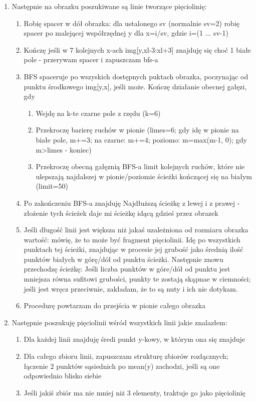 \documentclass[12pt]{article}
\begin{document}
\begin {enumerate}
\begin {enumerate}
		\end {enumerate}
		\item{Następnie na obrazku poszukiwane są linie tworzące pięciolinię:}
		\begin {enumerate}
			\item{Robię spacer w dół obrazka: dla ustalonego sv (normalnie sv=2) robię spacer po malejącej współrzędnej y dla x=i/sv, gdzie i=(1 ... sv-1)}
			\item{Kończę jeśli w 7 kolejnych x-ach img[y,xl-3:xl+3] znajduję się choć 1 białe pole - przerywam spacer i zapuszczam bfs-a}
			\item{BFS spaceruje po wszyskich dostępnych puktach obrazka, poczynając od punktu środkowego img[y,x], jeśli może. Kończę działanie obecnej gałęzi, gdy}
			\begin{enumerate}
				\item{Wejdę na k-te czarne pole z rzędu (k=6)}
				\item{Przekroczę barierę ruchów w pionie (limes=6; gdy idę w pionie na białe pole, m+=3; na czarne: m+=4; poziomo: m=max(m-1, 0); gdy m>limes - koniec)}
				\item{Przekroczę obecną gałęznią BFS-a limit kolejnych ruchów, które nie ulepszają najdalszej w pionie/poziomie ścieżki kończącej się na białym (limit=50)}
			\end{enumerate}
			\item{Po zakończeniu BFS-a znajduję Najdłuższą ścieżkę z lewej i z prawej - złożenie tych ścieżek daje mi ścieżkę idącą gdzieś przez obrazek}
			\item{Jeśli długość linii jest większa niż jakaś uzależniona od rozmiaru obrazka wartość: mówię, że to może być fragment pięciolinii. Idę po wszystkich punktach tej ścieżki, znajdując w procesie
			jej grubość jako średnią ilość punktów białych w górę/dół od punktu ścieżki. Następnie znowu przechodzę ścieżkę: Jeśli liczba punktów w góre/dół od punktu jest mniejsza równa sufitowi grubości, 
			punkty te zostają skąpnae w ciemności; jeśli jest wręcz przeciwnie, zakładam, że to są nuty i ich nie dotykam.}
			\item{Procedurę powtarzam do przejścia w pionie całego obrazka}
		\end {enumerate}
		\item{Następnie poszukuję pięciolinii wśród wszystkich linii jakie znalazłem:}
		\begin{enumerate}
			\item{Dla każdej linii znajduję średi punkt y-kowy, w którym ona się znajduje}
			\item{Dla całego zbioru linii, zapuszczam strukturę zbiorów rozłącznych; łączenie 2 punktów sąsiednich po mean(y) zachodzi, jeśli są one odpowiednio blisko siebie}
			\item{Jeśli jakiś zbiór ma nie mniej niż 3 elementy, traktuje go jako pięciolinię}
		\end{enumerate}
		
	\end {enumerate}
	
\end{document}

